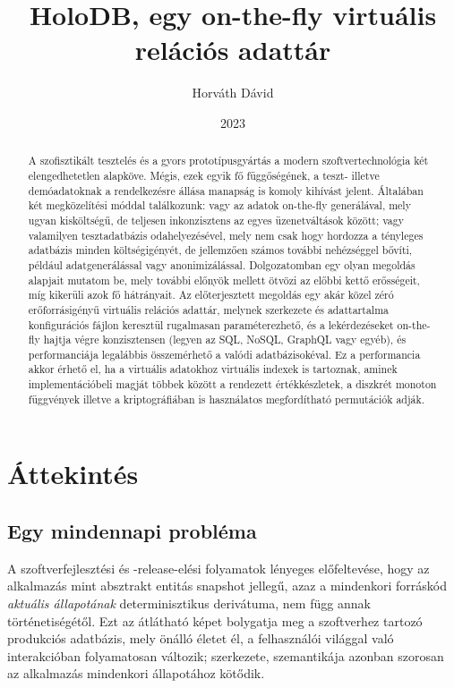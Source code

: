 \documentclass[
    parspace,
    noindent,
    nohyp,
]{elteiktdk}[2023/04/10]
\title{HoloDB, egy on-the-fly virtuális relációs adattár}
\date{2023}
\author{Horváth Dávid}
\affiliation{PhD, Mesteroktató}
\begin{document}

\listoftodos
\cleardoublepage

\makecover
\cleardoublepage

\maketitle

\tableofcontents
\cleardoublepage


\begin{abstract}
A szofisztikált tesztelés és a gyors prototípusgyártás
a modern szoftvertechnológia két elengedhetetlen alapköve.
Mégis, ezek egyik fő függőségének, a teszt- illetve demóadatoknak
a rendelkezésre állása manapság is komoly kihívást jelent.
Általában két megközelítési móddal találkozunk:
vagy az adatok on-the-fly generálával, mely ugyan kisköltségű,
de teljesen inkonzisztens az egyes üzenetváltások között;
vagy valamilyen tesztadatbázis odahelyezésével,
mely nem csak hogy hordozza a tényleges adatbázis minden költségigényét,
de jellemzően számos további nehézséggel bővíti, például adatgenerálással vagy anonimizálással.
Dolgozatomban egy olyan megoldás alapjait mutatom be,
mely további előnyök mellett ötvözi az előbbi kettő erősségeit,
míg kikerüli azok fő hátrányait.
Az előterjesztett megoldás egy akár közel zéró erőforrásigényű virtuális relációs adattár,
melynek szerkezete és adattartalma konfigurációs fájlon keresztül rugalmasan paraméterezhető,
és a lekérdezéseket on-the-fly hajtja végre konzisztensen
(legyen az SQL, NoSQL, GraphQL vagy egyéb),
és performanciája legalábbis összemérhető a valódi adatbázisokéval.
Ez a performancia akkor érhető el, ha a virtuális adatokhoz virtuális indexek is tartoznak,
aminek implementációbeli magját többek között a rendezett értékkészletek,
a diszkrét monoton függvények
illetve a kriptográfiában is használatos megfordítható permutációk adják.
\end{abstract}

\chapter{Áttekintés}

\section{Egy mindennapi probléma}

A szoftverfejlesztési és -release-elési folyamatok lényeges előfeltevése,
hogy az alkalmazás mint absztrakt entitás snapshot jellegű,
azaz a mindenkori forráskód \textit{aktuális állapotának} determinisztikus derivátuma,
nem függ annak történetiségétől.
Ezt az átlátható képet bolygatja meg a szoftverhez tartozó produkciós adatbázis,
mely önálló életet él, a felhasználói világgal való interakcióban folyamatosan változik;
szerkezete, szemantikája azonban szorosan az alkalmazás mindenkori állapotához kötődik.
\end{document}
